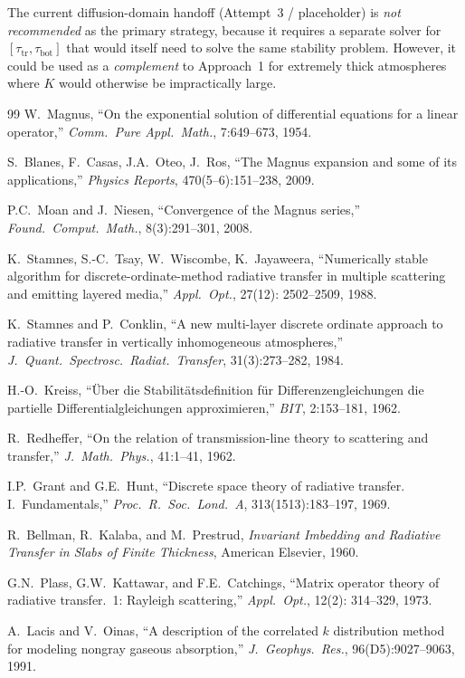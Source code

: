 \documentclass[11pt,a4paper]{article}
\newcommand{\tbot}{\tau_{\mathrm{bot}}}
\newcommand{\ttrans}{\tau_{\mathrm{tr}}}
\theoremstyle{definition}
\begin{document}
The current diffusion-domain handoff (Attempt~3 / placeholder) is
\emph{not recommended} as the primary strategy, because it requires a
separate solver for $[\ttrans,\tbot]$ that would itself need to solve
the same stability problem.  However, it could be used as a
\emph{complement} to Approach~1 for extremely thick atmospheres where
$K$ would otherwise be impractically large.


\begin{thebibliography}{99}
W.~Magnus, ``On the exponential solution of differential equations for a
linear operator,'' \emph{Comm.\ Pure Appl.\ Math.}, 7:649--673, 1954.

S.~Blanes, F.~Casas, J.A.~Oteo, J.~Ros, ``The Magnus expansion and some
of its applications,'' \emph{Physics Reports}, 470(5--6):151--238, 2009.

P.C.~Moan and J.~Niesen, ``Convergence of the Magnus series,''
\emph{Found.\ Comput.\ Math.}, 8(3):291--301, 2008.

K.~Stamnes, S.-C.~Tsay, W.~Wiscombe, K.~Jayaweera, ``Numerically stable
algorithm for discrete-ordinate-method radiative transfer in multiple
scattering and emitting layered media,'' \emph{Appl.\ Opt.}, 27(12):
2502--2509, 1988.

K.~Stamnes and P.~Conklin, ``A new multi-layer discrete ordinate approach to
radiative transfer in vertically inhomogeneous atmospheres,'' \emph{J.\ Quant.\
Spectrosc.\ Radiat.\ Transfer}, 31(3):273--282, 1984.

H.-O.~Kreiss, ``\"Uber die Stabilit\"atsdefinition f\"ur
Differenzengleichungen die partielle Differentialgleichungen
approximieren,'' \emph{BIT}, 2:153--181, 1962.

R.~Redheffer, ``On the relation of transmission-line theory to scattering and
transfer,'' \emph{J.\ Math.\ Phys.}, 41:1--41, 1962.

I.P.~Grant and G.E.~Hunt, ``Discrete space theory of radiative transfer.
I.~Fundamentals,'' \emph{Proc.\ R.\ Soc.\ Lond.\ A}, 313(1513):183--197, 1969.

R.~Bellman, R.~Kalaba, and M.~Prestrud, \emph{Invariant Imbedding and
Radiative Transfer in Slabs of Finite Thickness}, American Elsevier, 1960.

G.N.~Plass, G.W.~Kattawar, and F.E.~Catchings, ``Matrix operator theory of
radiative transfer.\ 1: Rayleigh scattering,'' \emph{Appl.\ Opt.}, 12(2):
314--329, 1973.

A.~Lacis and V.~Oinas, ``A description of the correlated $k$ distribution
method for modeling nongray gaseous absorption,'' \emph{J.\ Geophys.\ Res.},
96(D5):9027--9063, 1991.
\end{thebibliography}
\end{document}

